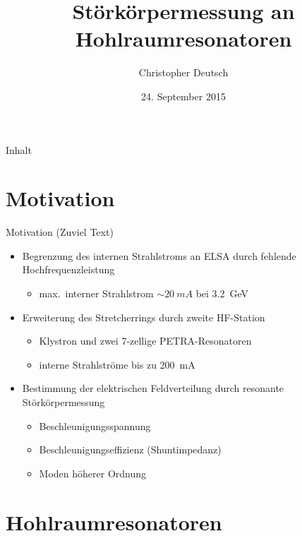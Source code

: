 \documentclass[12pt,xcolor=dvipsnames,professionalfonts]{beamer}
\author[Christopher Deutsch]
{Christopher Deutsch}
\title
{Störkörpermessung an Hohlraumresonatoren}
\subtitle
{}
\institute[]
{Physikalisches Institut der Universität Bonn\\
Seminar zur Bachelorarbeit}
\date{24. September 2015}
\begin{document}
\maketitle

\begin{frame}{Inhalt}
	\tableofcontents
\end{frame}

\section{Motivation}
\begin{frame}{Motivation (Zuviel Text)}
	\begin{itemize}
		\item Begrenzung des internen Strahlstroms an ELSA durch fehlende Hochfrequenzleistung
		\begin{itemize}
			\setlength\itemsep{0.25em}
			\item max.\ interner Strahlstrom  $\sim\SI{20}{mA}$ bei \SI{3.2}{GeV}
		\end{itemize}
		\vfill
		
		\item Erweiterung des Stretcherrings durch zweite HF-Station
		\begin{itemize}
			\setlength\itemsep{0.25em}
			\item Klystron und zwei 7-zellige PETRA-Resonatoren
			\item interne Strahlströme bis zu \SI{200}{mA}
		\end{itemize}
		\vfill
		
		\item Bestimmung der elektrischen Feldverteilung durch resonante Störkörpermessung
		\begin{itemize}
			\setlength\itemsep{0.25em}
			\item Beschleunigungsspannung
			\item Beschleunigungseffizienz (Shuntimpedanz)
			\item Moden höherer Ordnung
		\end{itemize}
	\end{itemize}
\end{frame}


\section{Hohlraumresonatoren}
\end{document}
